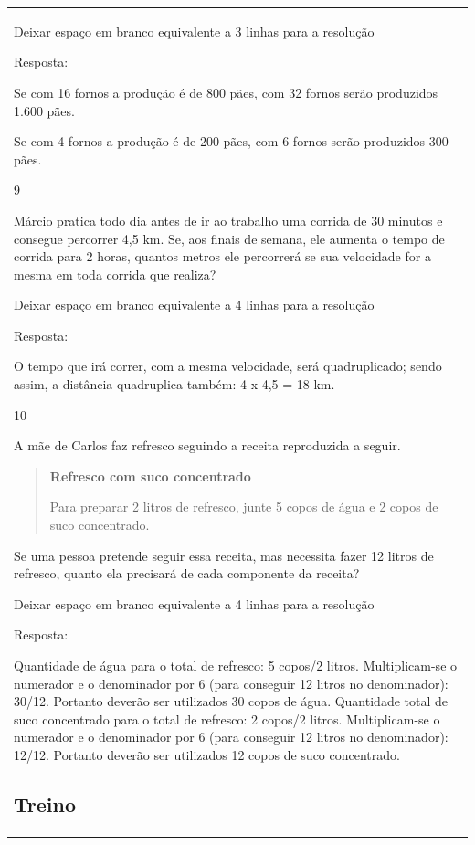 \begin{mdframed}[linewidth=2pt,linecolor=salmao,roundcorner=2pt]
\begin{escolha}
{{{\begin{longtable}[]{@{}l@{}}
\begin{itemize}
Deixar espaço em branco equivalente a 3 linhas para a resolução

Resposta:

\begin{escolha}
\item
  Se com 16 fornos a produção é de 800 pães, com 32 fornos serão produzidos 1.600 pães.
\item
  Se com 4 fornos a produção é de 200 pães, com 6 fornos serão produzidos 300 pães.
\end{escolha}

\num{9}

Márcio pratica todo dia antes de ir ao trabalho uma corrida de 30
minutos e consegue percorrer 4,5 km. Se, aos finais de semana, ele aumenta o
tempo de corrida para 2 horas, quantos metros ele percorrerá se sua
velocidade for a mesma em toda corrida que realiza?

Deixar espaço em branco equivalente a 4 linhas para a resolução

Resposta:

O tempo que irá correr, com a mesma velocidade, será quadruplicado; sendo assim, a distância quadruplica também: 4 x 4,5 = 18 km.

\num{10}

A mãe de Carlos faz refresco seguindo a receita reproduzida a seguir.

\begin{quote}
\textbf{Refresco com suco concentrado}

Para preparar 2 litros de refresco, junte 5 copos de água e 2 copos de suco concentrado.
\end{quote}

Se uma pessoa pretende seguir essa receita, mas necessita fazer 12
litros de refresco, quanto ela precisará de cada componente da receita?

Deixar espaço em branco equivalente a 4 linhas para a resolução

Resposta:

Quantidade de água para o total de refresco: 5 copos/2 litros.
Multiplicam-se o numerador e o denominador por 6 (para conseguir 12 litros no denominador): 30/12.
Portanto deverão ser utilizados 30 copos de água.
Quantidade total de suco concentrado para o total de refresco: 2 copos/2 litros.
Multiplicam-se o numerador e o denominador por 6 (para conseguir 12 litros no denominador): 12/12.
Portanto deverão ser utilizados 12 copos de suco concentrado.

\subsection{Treino}


\end{itemize}
\end{longtable}}}}
\end{escolha}
\end{mdframed}
